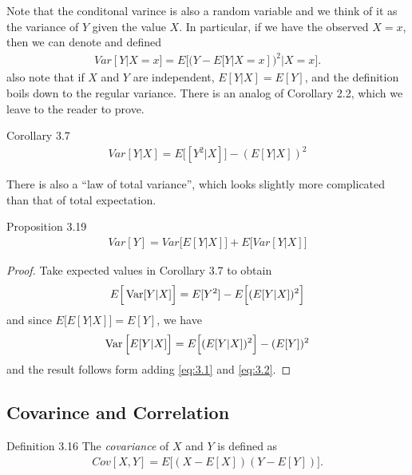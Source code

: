 Note that the conditonal varince is also a random variable and we think of it as the variance of $Y$ given the value $X$. In particular,  if we have the observed $X = x$, then we can denote and defined
\begin{align*}
  Var[Y|X = x] = E\Big[(Y - E[Y|X = x])^2|X = x\Big].
\end{align*}
also note that if $X$ and $Y$ are independent, $E[Y|X]=E[Y]$, and the definition boils down to the regular variance. There is an analog of Corollary 2.2, which we leave to the reader to prove.

\begin{boks}{Corollary 3.7}
  \begin{align*}
    Var[Y|X] = E\Big[[Y^2|X]\Big] - (E[Y|X])^2
  \end{align*}
\end{boks}

There is also a ``law of total variance'', which looks slightly more complicated than that of total expectation.

\begin{boks}{Proposition 3.19}
  \begin{align*}
    Var[Y] = Var\Big[ E[Y|X] \Big] + E\Big[Var[Y|X]\Big]
  \end{align*}
\end{boks}
\begin{proof}
  Take expected values in Corollary 3.7 to obtain
  \begin{align}\label{eq:3.1}
    E\Big[ \operatorname{Var}[Y|X] \Big] = E[Y^2] - E \Big[ (E[Y|X])^2 \Big]
  \end{align}
  and since $E\Big[E[Y|X]\Big] = E[Y]$, we have
  \begin{align}\label{eq:3.2}
    \operatorname{Var}\Big[ E[Y|X] \Big] = E\Big[ (E[Y|X])^2 \Big] - (E[Y])^2
  \end{align}
  and the result follows form adding \eqref{eq:3.1} and \eqref{eq:3.2}.
\end{proof}

\subsection{Covarince and Correlation}

\begin{boks}{Definition 3.16}
  The \textit{covariance} of $X$ and $Y$ is defined as
  \begin{align*}
    Cov[X, Y] = E\Big[(X - E[X])(Y - E[Y])\Big].
  \end{align*}
\end{boks}

